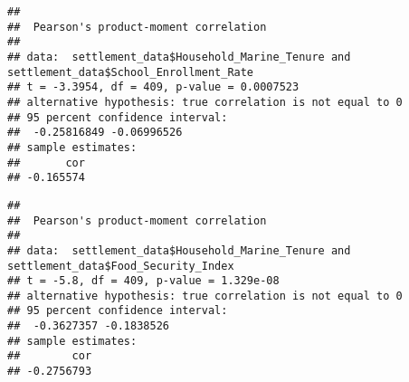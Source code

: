 \documentclass[
]{article}
\newenvironment{Shaded}{\begin{snugshade}}{\end{snugshade}}
\newcommand{\CommentTok}[1]{\textcolor[rgb]{0.56,0.35,0.01}{\textit{#1}}}
\newcommand{\FunctionTok}[1]{\textcolor[rgb]{0.13,0.29,0.53}{\textbf{#1}}}
\newcommand{\NormalTok}[1]{#1}
\newcommand{\SpecialCharTok}[1]{\textcolor[rgb]{0.81,0.36,0.00}{\textbf{#1}}}
\begin{document}
\begin{Shaded}
\end{Shaded}

\begin{verbatim}
## 
##  Pearson's product-moment correlation
## 
## data:  settlement_data$Household_Marine_Tenure and settlement_data$School_Enrollment_Rate
## t = -3.3954, df = 409, p-value = 0.0007523
## alternative hypothesis: true correlation is not equal to 0
## 95 percent confidence interval:
##  -0.25816849 -0.06996526
## sample estimates:
##       cor 
## -0.165574
\end{verbatim}

\begin{Shaded}
\end{Shaded}

\begin{verbatim}
## 
##  Pearson's product-moment correlation
## 
## data:  settlement_data$Household_Marine_Tenure and settlement_data$Food_Security_Index
## t = -5.8, df = 409, p-value = 1.329e-08
## alternative hypothesis: true correlation is not equal to 0
## 95 percent confidence interval:
##  -0.3627357 -0.1838526
## sample estimates:
##        cor 
## -0.2756793
\end{verbatim}

\begin{Shaded}
\end{Shaded}
\end{document}
